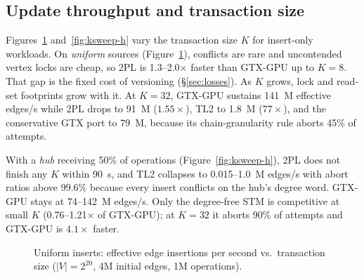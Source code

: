 \documentclass[sigconf,nonacm]{acmart}
\newcommand{\sys}{GTX-GPU}
\begin{document}
\subsection{Update throughput and transaction size}
Figures~\ref{fig:ksweep-u} and~\ref{fig:ksweep-h} vary the transaction size $K$ for insert-only workloads. On
\emph{uniform} sources (Figure~\ref{fig:ksweep-u}), conflicts are rare and uncontended vertex locks are cheap, so 2PL is
1.3--2.0$\times$ faster than \sys{} up to $K{=}8$. That gap is the fixed cost of versioning (\S\ref{sec:losses}). As
$K$ grows, lock and read-set footprints grow with it. At $K{=}32$, \sys{} sustains 141~M effective edges/s while 2PL
drops to 91~M ($1.55\times$), TL2 to 1.8~M ($77\times$), and the conservative GTX port to 79~M, because its
chain-granularity rule aborts 45\% of attempts.

With a \emph{hub} receiving 50\% of operations (Figure~\ref{fig:ksweep-h}), 2PL does not finish any $K$ within 90~s, and
TL2 collapses to 0.015--1.0~M edges/s with abort ratios above 99.6\% because every insert conflicts on the hub's degree
word. \sys{} stays at 74--142~M edges/s. Only the degree-free STM is competitive at small $K$ (0.76--1.21$\times$ of
\sys{}); at $K{=}32$ it aborts 90\% of attempts and \sys{} is $4.1\times$ faster.


\begin{figure}[t]
\centering
{}
\caption{Uniform inserts: effective edge insertions per second vs.\ transaction size ($|V|{=}2^{20}$, 4M initial edges,
1M operations).}
\label{fig:ksweep-u}
\end{figure}
\end{document}
